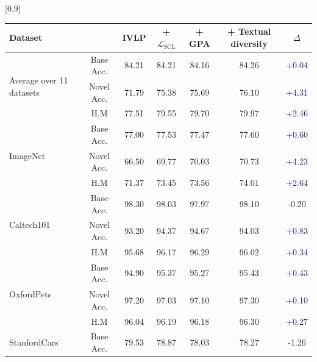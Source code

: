 
\begin{table}[!t]
    \small \centering
 \setlength{\tabcolsep}{12pt}
    \scalebox{0.9}[0.9]{
\begin{tabular}{lc|cccc|c}
\toprule
\textbf{Dataset} & 
 & 
\textbf{IVLP} &
\textbf{+ $\mathcal{L}_\text{SCL}$} & 
\textbf{+ GPA} & 
\textbf{ + Textual diversity} &
\textbf{$\Delta$} \\ \midrule
\multirow{3}{*}{Average over 11 datasets}  & Base Acc.& 84.21       & 84.21   & 84.16  & 84.26 &   \textcolor{MidnightBlue}{{+0.04}}\\
                               & Novel Acc.     & 71.79  & 75.38   & 75.69  & 76.10  &   \textcolor{MidnightBlue}{{+4.31}}\\
                               & H.M            & 77.51  & 79.55   & 79.70 &79.97  &   \textcolor{MidnightBlue}{{+2.46}}\\
\midrule
\multirow{3}{*}{ImageNet}      & Base Acc.      & 77.00  & 77.53   &  77.47 &  77.60 &  \textcolor{MidnightBlue}{{+0.60}}\\ 
                               & Novel Acc.     & 66.50  & 69.77   &  70.03 & 70.73&    \textcolor{MidnightBlue}{{+4.23}}\\ 
                               & H.M            & 71.37  & 73.45   &  73.56 & 74.01&  \textcolor{MidnightBlue}{{+2.64}}\\
\midrule
\multirow{3}{*}{Caltech101}    & Base Acc.      & 98.30  & 98.03   & 97.97 & 98.10 &   \textcolor{Bittersweet}{{-0.20}}\\
                               & Novel Acc.     & 93.20  & 94.37   &  94.67 & 94.03 & \textcolor{MidnightBlue}{{+0.83}}\\
                               & H.M            & 95.68  & 96.17   &  96.29 &  96.02 &  \textcolor{MidnightBlue}{{+0.34}}\\
\midrule
\multirow{3}{*}{OxfordPets}    & Base Acc.      & 94.90  & 95.37   & 95.27 & {95.43}   &  \textcolor{MidnightBlue}{{+0.43}}\\
                               & Novel Acc.     & 97.20  & 97.03   & {97.10} & {97.30}  &   \textcolor{MidnightBlue}{{+0.10}}\\
                               & H.M            & 96.04  & 96.19   & {96.18} & {96.30}  &   \textcolor{MidnightBlue}{{+0.27}}\\
\midrule
\multirow{3}{*}{StanfordCars}  & Base Acc.     & 79.53 & 78.87    & 78.03 &78.27 &  \textcolor{Bittersweet}{{-1.26}}\\

\end{tabular}}
\end{table}
